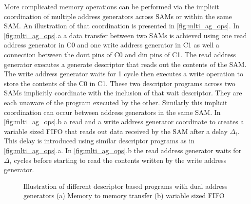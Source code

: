 More complicated memory operations can be performed via the implicit
coordination of multiple address generators across SAMs or within the same SAM.
An illustration of that coordination is presented in \autoref{fig:mlti_ag_ops}.
In \autoref{fig:mlti_ag_ops}.a a data transfer between two SAMs is achieved
using one read address generator in C0 and one write address generator in C1 as
well a connection between the dout pins of C0 and din pins of C1.
The read address generator executes a generate descriptor that reads out the
contents of the SAM. The write address generator waits for 1 cycle then executes
a write operation to store the contents of the C0 in C1. These two descriptor
programs across two SAMs implicitly coordinate with the inclusion of that wait
descriptor. They are each unaware of the program executed by the other.
Similarly this implicit coordination can occur between address generators in the
same SAM. In \autoref{fig:mlti_ag_ops}.b a read and a write address generator
coordinate to creates a variable sized FIFO that reads out data received by the SAM
after a delay $\Delta_i$. This delay is introduced using similar descriptor
programs as in \autoref{fig:mlti_ag_ops}.a. In \autoref{fig:mlti_ag_ops}.b the
read address generator waits for $\Delta_i$ cycles before starting to read the
contents written by the write address generator.

\begin{figure}
    \centering
    \caption{Illustration of different descriptor based programs with dual address generators (a) Memory to memory transfer (b) variable sized FIFO }
    \label{fig:mlti_ag_ops}
\end{figure}



